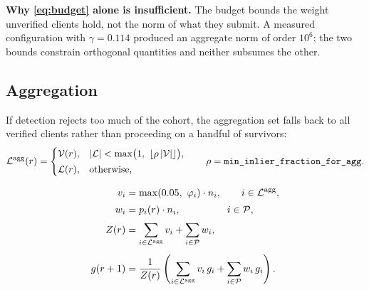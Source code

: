 \medskip
\noindent
\textbf{Why \eqref{eq:budget} alone is insufficient.} The budget bounds the
weight unverified clients hold, not the norm of what they submit. A measured
configuration with $\gamma = 0.114$ produced an aggregate norm of order $10^6$;
the two bounds constrain orthogonal quantities and neither subsumes the other.

\subsection{Aggregation}

If detection rejects too much of the cohort, the aggregation set falls back to
all verified clients rather than proceeding on a handful of survivors:
\begin{equation}
\mathcal{L}^{\mathrm{agg}}(r) =
\begin{cases}
\mathcal{V}(r), & \lvert\mathcal{L}\rvert < \max\bigl(1,\ \lfloor \rho\,\lvert\mathcal{V}\rvert \rfloor\bigr),\\[2pt]
\mathcal{L}(r), & \text{otherwise,}
\end{cases}
\qquad \rho = \texttt{min\_inlier\_fraction\_for\_agg}.
\label{eq:fallback}
\end{equation}

\begin{align}
v_i &= \max(0.05,\ \varphi_i)\cdot n_i, \qquad i \in \mathcal{L}^{\mathrm{agg}},
\label{eq:vweight}\\[2pt]
w_i &= p_i(r)\cdot n_i, \qquad\qquad\ \ i \in \mathcal{P},
\label{eq:pweight}\\[2pt]
Z(r) &= \sum_{i \in \mathcal{L}^{\mathrm{agg}}} v_i + \sum_{i \in \mathcal{P}} w_i,
\label{eq:norm}\\[4pt]
g(r+1) &= \frac{1}{Z(r)}
\left( \sum_{i \in \mathcal{L}^{\mathrm{agg}}} v_i\, g_i + \sum_{i \in \mathcal{P}} w_i\, g_i \right).
\label{eq:aggregate}
\end{align}


